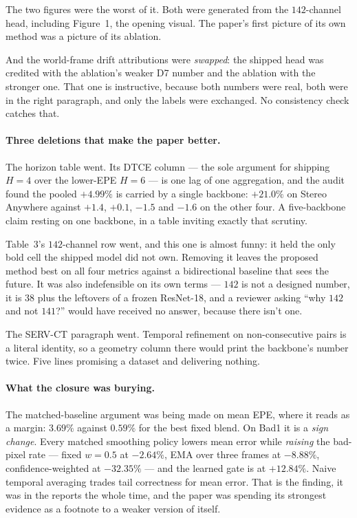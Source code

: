 \documentclass[11pt,a4paper]{article}
\begin{document}
The two figures were the worst of it. Both were generated from the $142$-channel
head, including Figure~1, the opening visual. The paper's first picture of its own
method was a picture of its ablation.

And the world-frame drift attributions were \emph{swapped}: the shipped head was
credited with the ablation's weaker D7 number and the ablation with the stronger one.
That one is instructive, because both numbers were real, both were in the right
paragraph, and only the labels were exchanged. No consistency check catches that.

\paragraph{Three deletions that make the paper better.} The horizon table went. Its
DTCE column --- the sole argument for shipping $H{=}4$ over the lower-EPE $H{=}6$ ---
is one lag of one aggregation, and the audit found the pooled $+4.99\%$ is carried by
a single backbone: $+21.0\%$ on Stereo Anywhere against $+1.4$, $+0.1$, $-1.5$ and
$-1.6$ on the other four. A five-backbone claim resting on one backbone, in a table
inviting exactly that scrutiny.

Table~3's $142$-channel row went, and this one is almost funny: it held the only bold
cell the shipped model did not own. Removing it leaves the proposed method best on all
four metrics against a bidirectional baseline that sees the future. It was also
indefensible on its own terms --- $142$ is not a designed number, it is $38$ plus the
leftovers of a frozen ResNet-18, and a reviewer asking ``why $142$ and not $141$?''
would have received no answer, because there isn't one.

The SERV-CT paragraph went. Temporal refinement on non-consecutive pairs is a literal
identity, so a geometry column there would print the backbone's number twice. Five
lines promising a dataset and delivering nothing.

\paragraph{What the closure was burying.} The matched-baseline argument was being made
on mean EPE, where it reads as a margin: $3.69\%$ against $0.59\%$ for the best fixed
blend. On Bad1 it is a \emph{sign change}. Every matched smoothing policy lowers mean
error while \emph{raising} the bad-pixel rate --- fixed $w{=}0.5$ at $-2.64\%$, EMA
over three frames at $-8.88\%$, confidence-weighted at $-32.35\%$ --- and the learned
gate is at $+12.84\%$. Naive temporal averaging trades tail correctness for mean error.
That is the finding, it was in the reports the whole time, and the paper was spending
its strongest evidence as a footnote to a weaker version of itself.
\end{document}
